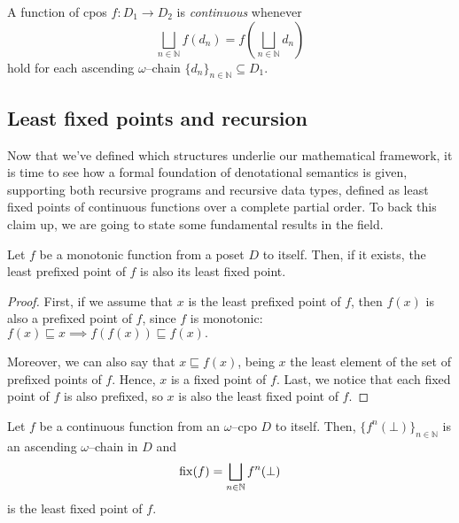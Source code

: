 \begin{dfn}
  A function of cpos \(f \colon D_1 \to D_2\) is \emph{continuous} whenever
  \begin{equation*}
    \bigsqcup_{n \in \mathbb{N}} f(d_n) = f\left(\bigsqcup_{n\in\mathbb{N}}d_n\right)
  \end{equation*}
  hold for each ascending \(\omega\)--chain \(\lbrace d_n \rbrace_{n \in \mathbb{N}} \subseteq D_1\). %
\end{dfn}

\subsection[Fixed points]{Least fixed points and recursion}

Now that we've defined which structures underlie our mathematical framework, it is time to see how a formal foundation of denotational semantics is given, supporting both recursive programs and recursive data types, defined as least
fixed points of continuous functions over a complete partial order.
To back this claim up, we are going to state some fundamental results in the field.

\begin{lem}\label{lem:cpo-prefixed}
  Let \(f\) be a monotonic function from a poset \(D\) to itself.
  Then, if it exists, the least prefixed point of \(f\) is also its least fixed point.
\end{lem}
\begin{proof}
  First, if we assume that \(x\) is the least prefixed point of \(f\), then \(f(x)\) is also a prefixed point of \(f\), since \(f\) is monotonic:
  \(
    f(x) \sqsubseteq x \implies f(f(x)) \sqsubseteq f(x).
  \)
  
  Moreover, we can also say that \(x \sqsubseteq f(x)\), being \(x\) the least element of the set of prefixed points of \(f\).
  Hence, \(x\) is a fixed point of \(f\).
  Last, we notice that each fixed point of \(f\) is also prefixed, so \(x\) is also the least fixed point of \(f\).\qedhere
\end{proof}

\begin{thm}\label{thm:cpo-fixed}
  Let \(f\) be a continuous function from an \(\omega\)--cpo \(D\) to itself. %
  Then, \(\lbrace f^n(\bot) \rbrace_{n \in \mathbb{N}}\) is an ascending \(\omega\)--chain in \(D\) and %
  \begin{equation}
    \operatorname{fix}(f) = \bigsqcup_{n \in \mathbb{N}} f^n(\bot)
  \end{equation}
  is the least fixed point of \(f\).
\end{thm}

